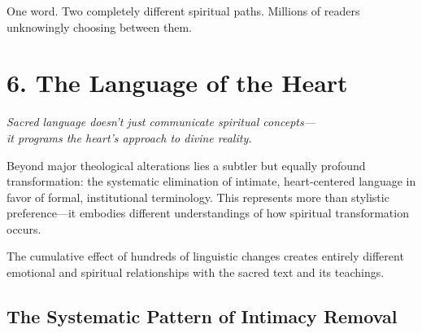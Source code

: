 \documentclass[11pt,twoside]{book}
\begin{document}
One word. Two completely different spiritual paths. Millions of readers unknowingly choosing between them.
\chapter*{6. The Language of the Heart}
\label{sec:org11b4f9c}

{\centering\itshape Sacred language doesn't just communicate spiritual concepts—\\it programs the heart's approach to divine reality.\par}
\vspace{0.3cm}

\normalfont\justifying
Beyond major theological alterations lies a subtler but equally profound transformation: the systematic elimination of intimate, heart-centered language in favor of formal, institutional terminology. This represents more than stylistic preference—it embodies different understandings of how spiritual transformation occurs.

The cumulative effect of hundreds of linguistic changes creates entirely different emotional and spiritual relationships with the sacred text and its teachings.
\section*{The Systematic Pattern of Intimacy Removal}
\label{sec:org9b83f84}
\end{document}
